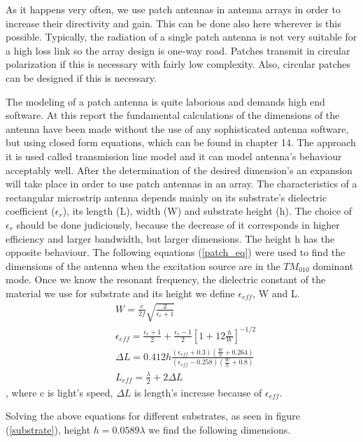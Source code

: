 As it happens very often, we use patch antennas in antenna arrays in order to increase their directivity and gain. This can be done also here wherever is this possible. Typically, the radiation of a single patch antenna is not very suitable for a high loss link so the array design is one-way road. Patches transmit in circular polarization if this is necessary with fairly low complexity. Also, circular patches can be designed if this is necessary. 

The modeling of a patch antenna is quite laborious and demands high end software. At this report the fundamental calculations of the dimensions of the antenna have been made without the use of any sophisticated antenna software, but using closed form equations, which can be found in \cite{balanis} chapter 14. The approach it is used called transmission line model and it can model antenna's behaviour acceptably well. After the determination of the desired dimension's an expansion will take place in order to use patch antennas in an array.
The characteristics of a rectangular microstrip antenna depends mainly on its substrate's dielectric coefficient ($\epsilon_{r}$), its length (L), width (W) and substrate height (h). The choice of $\epsilon_{r}$ should be done judiciously, because the decrease of it corresponds in higher efficiency and larger bandwidth, but larger dimensions. The height h has the opposite behaviour. The following equations (\ref{patch_eq}) were used to find the dimensions of the antenna when the excitation source are in the $TM_{010}$ dominant mode. Once we know the resonant frequency, the dielectric constant of the material we use for substrate and its height we define $\epsilon_{eff}$, W and L.
\begin{subequations}
\begin{align}
   &W=\frac{c}{2f} \sqrt{\frac{2}{\epsilon_{r}+1}} \\
   &\epsilon_{eff}=\frac{\epsilon_{r}+1}{2}+\frac{\epsilon_{r}-1}{2}[1+12\frac{h}{W}]^{-1/2} \\
   &\Delta L=0.412 h \frac{(\epsilon_{eff}+0.3)(\frac{W}{h}+0.264)}{(\epsilon_{eff}-0.258)(\frac{W}{h}+0.8)} \\
   &L_{eff}=\frac{\lambda}{2}+2\Delta L
\end{align}
\label{patch_eq}
\end{subequations}
, where c is light's speed, $\Delta L$ is length's increase because of $\epsilon_{eff}$.

Solving the above equations for different substrates, as seen in figure (\ref{substrate}), height $h=0.0589 \lambda$ we find the following dimensions.

